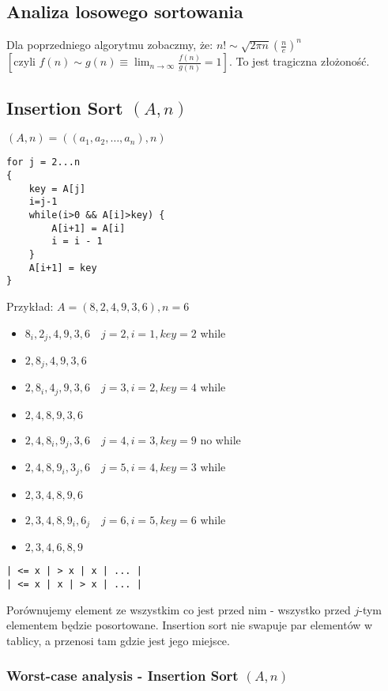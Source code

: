 \documentclass{article}
\numberwithin{equation}{subsection}
\begin{document}
\subsection{Analiza losowego sortowania}

Dla poprzedniego algorytmu zobaczmy, że: $n! \sim \sqrt{2\pi n} \left(\frac{n}{e}\right)^n$ $\left[\text{czyli } f(n)\sim g(n) \equiv \lim_{n\rightarrow \infty} \frac{f(n)}{g(n)} = 1 \right]$. To jest tragiczna złożoność.

\subsection{Insertion Sort $(A,n)$}

$(A,n) = ((a_1,a_2,\dots, a_n),n)$

\begin{verbatim}
for j = 2...n
{
    key = A[j]
    i=j-1
    while(i>0 && A[i]>key) {
        A[i+1] = A[i]
        i = i - 1
    }
    A[i+1] = key
}
\end{verbatim}

\noindent
Przykład: $A=(8, 2, 4, 9, 3, 6), n = 6$

\begin{itemize}
    \item $8_i, 2_j, 4, 9, 3, 6 \quad j=2, i=1, key = 2$ while
    \item $2, 8_j, 4, 9, 3, 6$
    \item $2, 8_i, 4_j, 9, 3, 6 \quad j=3, i=2, key = 4$ while
    \item $2, 4, 8, 9, 3, 6$
    \item $2, 4, 8_i, 9_j, 3, 6 \quad j=4, i=3, key = 9$ no while
    \item $2, 4, 8, 9_i, 3_j, 6 \quad j=5, i=4, key = 3$ while
    \item $2, 3, 4, 8, 9, 6$
    \item $2, 3, 4, 8, 9_i ,6_j \quad j=6, i=5, key = 6$ while
    \item $2, 3, 4, 6, 8, 9$
\end{itemize}

\begin{verbatim}
| <= x | > x | x | ... |
| <= x | x | > x | ... |
\end{verbatim}

\noindent
Porównujemy element ze wszystkim co jest przed nim - wszystko przed $j$-tym elementem będzie posortowane. Insertion sort nie swapuje par elementów w tablicy, a przenosi tam gdzie jest jego miejsce.

\subsubsection{Worst-case analysis - Insertion Sort $(A,n)$}
\end{document}
